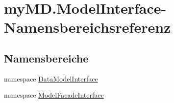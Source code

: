 \hypertarget{namespacemy_m_d_1_1_model_interface}{}\section{my\+M\+D.\+Model\+Interface-\/\+Namensbereichsreferenz}
\label{namespacemy_m_d_1_1_model_interface}
\subsection*{Namensbereiche}
\begin{DoxyCompactItemize}
\item 
namespace \mbox{\hyperlink{namespacemy_m_d_1_1_model_interface_1_1_data_model_interface}{Data\+Model\+Interface}}
\item 
namespace \mbox{\hyperlink{namespacemy_m_d_1_1_model_interface_1_1_model_facade_interface}{Model\+Facade\+Interface}}
\end{DoxyCompactItemize}
